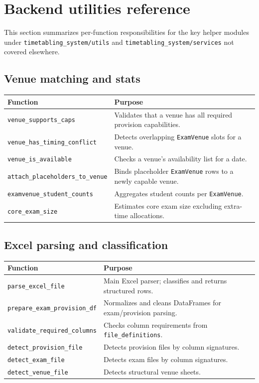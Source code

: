 \section{Backend utilities reference}
\label{sec:backend:utils}

This section summarizes per-function responsibilities for the key helper modules under \texttt{timetabling\_system/utils} and \texttt{timetabling\_system/services} not covered elsewhere.

\subsection{Venue matching and stats}
\label{subsec:backend:utils:venue}

\begin{longtable}{p{}p{}}
\toprule
\textbf{Function} & \textbf{Purpose} \\
\midrule
\texttt{venue\_supports\_caps} & Validates that a venue has all required provision capabilities. \\
\texttt{venue\_has\_timing\_conflict} & Detects overlapping \texttt{ExamVenue} slots for a venue. \\
\texttt{venue\_is\_available} & Checks a venue's availability list for a date. \\
\texttt{attach\_placeholders\_to\_venue} & Binds placeholder \texttt{ExamVenue} rows to a newly capable venue. \\
\texttt{examvenue\_student\_counts} & Aggregates student counts per \texttt{ExamVenue}. \\
\texttt{core\_exam\_size} & Estimates core exam size excluding extra-time allocations. \\
\bottomrule
\end{longtable}

\subsection{Excel parsing and classification}
\label{subsec:backend:utils:excel}

\begin{longtable}{p{}p{}}
\toprule
\textbf{Function} & \textbf{Purpose} \\
\midrule
\texttt{parse\_excel\_file} & Main Excel parser; classifies and returns structured rows. \\
\texttt{prepare\_exam\_provision\_df} & Normalizes and cleans DataFrames for exam/provision parsing. \\
\texttt{validate\_required\_columns} & Checks column requirements from \texttt{file\_definitions}. \\
\texttt{detect\_provision\_file} & Detects provision files by column signatures. \\
\texttt{detect\_exam\_file} & Detects exam files by column signatures. \\
\texttt{detect\_venue\_file} & Detects structural venue sheets. \\
\bottomrule
\end{longtable}

